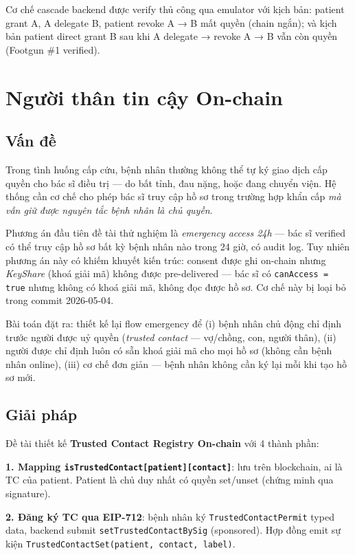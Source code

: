 \documentclass[../DoAn]{subfiles}
\begin{document}
\begin{itemize}
Cơ chế cascade backend được verify thủ công qua emulator với kịch bản: patient grant A, A delegate B, patient revoke A → B mất quyền (chain ngắn); và kịch bản patient direct grant B sau khi A delegate → revoke A → B vẫn còn quyền (Footgun \#1 verified).

\section{Người thân tin cậy On-chain}

\subsection{Vấn đề}

Trong tình huống cấp cứu, bệnh nhân thường không thể tự ký giao dịch cấp quyền cho bác sĩ điều trị --- do bất tỉnh, đau nặng, hoặc đang chuyển viện. Hệ thống cần cơ chế cho phép bác sĩ truy cập hồ sơ trong trường hợp khẩn cấp \textit{mà vẫn giữ được nguyên tắc bệnh nhân là chủ quyền}.

Phương án đầu tiên đề tài thử nghiệm là \textit{emergency access 24h} --- bác sĩ verified có thể truy cập hồ sơ bất kỳ bệnh nhân nào trong 24 giờ, có audit log. Tuy nhiên phương án này có khiếm khuyết kiến trúc: consent được ghi on-chain nhưng \textit{KeyShare} (khoá giải mã) không được pre-delivered --- bác sĩ có \texttt{canAccess = true} nhưng không có khoá giải mã, không đọc được hồ sơ. Cơ chế này bị loại bỏ trong commit 2026-05-04.

Bài toán đặt ra: thiết kế lại flow emergency để (i) bệnh nhân chủ động chỉ định trước người được uỷ quyền (\textit{trusted contact} --- vợ/chồng, con, người thân), (ii) người được chỉ định luôn có sẵn khoá giải mã cho mọi hồ sơ (không cần bệnh nhân online), (iii) cơ chế đơn giản --- bệnh nhân không cần ký lại mỗi khi tạo hồ sơ mới.

\subsection{Giải pháp}

Đề tài thiết kế \textbf{Trusted Contact Registry On-chain} với 4 thành phần:

\textbf{1. Mapping \texttt{isTrustedContact[patient][contact]}}: lưu trên blockchain, ai là TC của patient. Patient là chủ duy nhất có quyền set/unset (chứng minh qua signature).

\textbf{2. Đăng ký TC qua EIP-712}: bệnh nhân ký \texttt{TrustedContactPermit} typed data, backend submit \texttt{setTrustedContactBySig} (sponsored). Hợp đồng emit sự kiện \texttt{TrustedContactSet(patient, contact, label)}.


\end{itemize}
\end{document}
